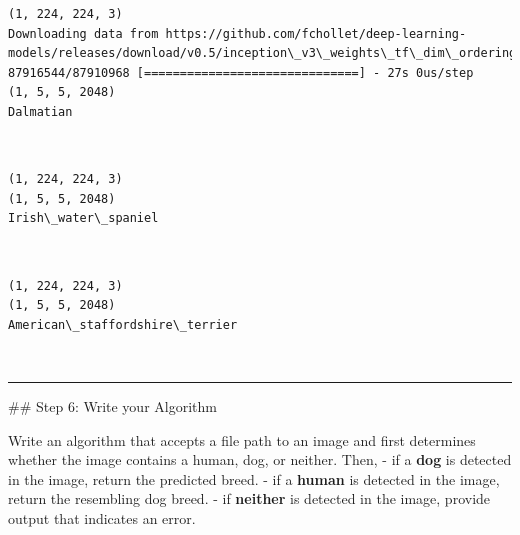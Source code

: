 \documentclass[11pt]{article}
\begin{document}
    \begin{Verbatim}[commandchars=\\\{\}]
(1, 224, 224, 3)
Downloading data from https://github.com/fchollet/deep-learning-models/releases/download/v0.5/inception\_v3\_weights\_tf\_dim\_ordering\_tf\_kernels\_notop.h5
87916544/87910968 [==============================] - 27s 0us/step
(1, 5, 5, 2048)
Dalmatian

    \end{Verbatim}

    \begin{center}
    \end{center}
    { \hspace*{\fill} \\}
    
    \begin{Verbatim}[commandchars=\\\{\}]
(1, 224, 224, 3)
(1, 5, 5, 2048)
Irish\_water\_spaniel

    \end{Verbatim}

    \begin{center}
    \end{center}
    { \hspace*{\fill} \\}
    
    \begin{Verbatim}[commandchars=\\\{\}]
(1, 224, 224, 3)
(1, 5, 5, 2048)
American\_staffordshire\_terrier

    \end{Verbatim}

    \begin{center}
    \end{center}
    { \hspace*{\fill} \\}
    
    \begin{center}\rule{0.5\linewidth}{\linethickness}\end{center}

 \#\# Step 6: Write your Algorithm

Write an algorithm that accepts a file path to an image and first
determines whether the image contains a human, dog, or neither. Then, -
if a \textbf{dog} is detected in the image, return the predicted breed.
- if a \textbf{human} is detected in the image, return the resembling
dog breed. - if \textbf{neither} is detected in the image, provide
output that indicates an error.
\end{document}
